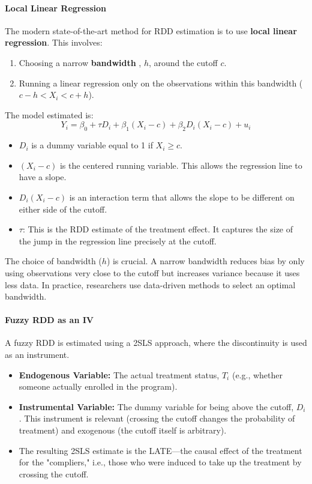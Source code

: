\documentclass{article}
\providecommand{\tightlist}{
  \setlength{\itemsep}{0pt}
  \setlength{\parskip}{0pt}}
\begin{document}
\paragraph{Local Linear Regression}
The modern state-of-the-art method for RDD estimation is to use \textbf{local linear regression}. This involves:
\begin{enumerate}
    \tightlist
    \item Choosing a narrow 
\textbf{bandwidth}
, $h$, around the cutoff $c$.
    \item Running a linear regression only on the observations within this bandwidth ($c-h < X_i < c+h$).
\end{enumerate}
The model estimated is:
\begin{equation}
    Y_i = \beta_0 + \tau D_i + \beta_1 (X_i - c) + \beta_2 D_i(X_i-c) + u_i
\end{equation}
\begin{itemize}
    \tightlist
    \item $D_i$ is a dummy variable equal to 1 if $X_i \ge c$.
    \item $(X_i-c)$ is the centered running variable. This allows the regression line to have a slope.
    \item $D_i(X_i-c)$ is an interaction term that allows the slope to be different on either side of the cutoff.
    \item $\tau$: This is the RDD estimate of the treatment effect. It captures the size of the jump in the regression line precisely at the cutoff.
\end{itemize}
The choice of bandwidth ($h$) is crucial. A narrow bandwidth reduces bias by only using observations very close to the cutoff but increases variance because it uses less data. In practice, researchers use data-driven methods to select an optimal bandwidth.

\paragraph{Fuzzy RDD as an IV}
A fuzzy RDD is estimated using a 2SLS approach, where the discontinuity is used as an instrument.
\begin{itemize}
    \tightlist
    \item 
\textbf{Endogenous Variable:}
 The actual treatment status, $T_i$ (e.g., whether someone actually enrolled in the program).
    \item 
\textbf{Instrumental Variable:}
 The dummy variable for being above the cutoff, $D_i$. This instrument is relevant (crossing the cutoff changes the probability of treatment) and exogenous (the cutoff itself is arbitrary).
    \item The resulting 2SLS estimate is the LATE—the causal effect of the treatment for the "compliers," i.e., those who were induced to take up the treatment by crossing the cutoff.
\end{itemize}
\end{document}
